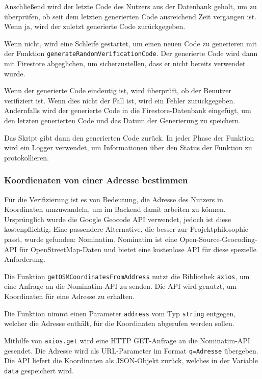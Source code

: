 Anschließend wird der letzte Code des Nutzers aus der Datenbank geholt, um zu überprüfen, ob seit dem letzten generierten Code ausreichend Zeit vergangen ist. Wenn ja, wird der zuletzt generierte Code zurückgegeben.

Wenn nicht, wird eine Schleife gestartet, um einen neuen Code zu generieren mit der Funktion \texttt{generateRandomVerificationCode}. Der generierte Code wird dann mit Firestore abgeglichen, um sicherzustellen, dass er nicht bereits verwendet wurde.

Wenn der generierte Code eindeutig ist, wird überprüft, ob der Benutzer verifiziert ist. Wenn dies nicht der Fall ist, wird ein Fehler zurückgegeben. Andernfalls wird der generierte Code in die Firestore-Datenbank eingefügt, um den letzten generierten Code und das Datum der Generierung zu speichern.

Das Skript gibt dann den generierten Code zurück. In jeder Phase der Funktion wird ein Logger verwendet, um Informationen über den Status der Funktion zu protokollieren.

\subsubsection{Koordienaten von einer Adresse bestimmen}
Für die Verifizierung ist es von Bedeutung, die Adresse des Nutzers in Koordinaten umzuwandeln, um im Backend damit arbeiten zu können. Ursprünglich wurde die Google Geocode API verwendet, jedoch ist diese kostenpflichtig. Eine passendere Alternative, die besser zur Projektphilosophie passt, wurde gefunden: Nominatim. Nominatim ist eine Open-Source-Geocoding-API für OpenStreetMap-Daten und bietet eine kostenlose API für diese spezielle Anforderung.

Die Funktion \texttt{getOSMCoordinatesFromAddress} nutzt die Bibliothek \texttt{axios}, um eine Anfrage an die Nominatim-API zu senden. Die API wird genutzt, um Koordinaten für eine Adresse zu erhalten.

Die Funktion nimmt einen Parameter \texttt{address} vom Typ \texttt{string} entgegen, welcher die Adresse enthält, für die Koordinaten abgerufen werden sollen.

Mithilfe von \texttt{axios.get} wird eine HTTP GET-Anfrage an die Nominatim-API gesendet. Die Adresse wird als URL-Parameter im Format \texttt{q=Adresse} übergeben. Die API liefert die Koordinaten als JSON-Objekt zurück, welches in der Variable \texttt{data} gespeichert wird.

